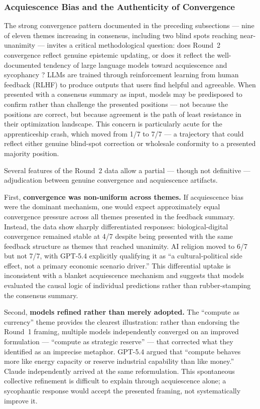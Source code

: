 \documentclass[preprint,review,12pt]{elsarticle}
\begin{document}
\subsubsection{Acquiescence Bias and the Authenticity of Convergence}

The strong convergence pattern documented in the preceding subsections --- nine of eleven themes increasing in consensus, including two blind spots reaching near-unanimity --- invites a critical methodological question: does Round~2 convergence reflect genuine epistemic updating, or does it reflect the well-documented tendency of large language models toward acquiescence and sycophancy \citep{perez2023sycophancy, sharma2024sycophancy}? LLMs are trained through reinforcement learning from human feedback (RLHF) to produce outputs that users find helpful and agreeable. When presented with a consensus summary as input, models may be predisposed to confirm rather than challenge the presented positions --- not because the positions are correct, but because agreement is the path of least resistance in their optimization landscape. This concern is particularly acute for the apprenticeship crash, which moved from 1/7 to 7/7 --- a trajectory that could reflect either genuine blind-spot correction or wholesale conformity to a presented majority position.

Several features of the Round~2 data allow a partial --- though not definitive --- adjudication between genuine convergence and acquiescence artifacts.

First, \textbf{convergence was non-uniform across themes.} If acquiescence bias were the dominant mechanism, one would expect approximately equal convergence pressure across all themes presented in the feedback summary. Instead, the data show sharply differentiated responses: biological-digital convergence remained stable at 4/7 despite being presented with the same feedback structure as themes that reached unanimity. AI religion moved to 6/7 but not 7/7, with GPT-5.4 explicitly qualifying it as ``a cultural-political side effect, not a primary economic scenario driver.'' This differential uptake is inconsistent with a blanket acquiescence mechanism and suggests that models evaluated the causal logic of individual predictions rather than rubber-stamping the consensus summary.

Second, \textbf{models refined rather than merely adopted.} The ``compute as currency'' theme provides the clearest illustration: rather than endorsing the Round~1 framing, multiple models independently converged on an improved formulation --- ``compute as strategic reserve'' --- that corrected what they identified as an imprecise metaphor. GPT-5.4 argued that ``compute behaves more like energy capacity or reserve industrial capability than like money.'' Claude independently arrived at the same reformulation. This spontaneous collective refinement is difficult to explain through acquiescence alone; a sycophantic response would accept the presented framing, not systematically improve it.
\end{document}
